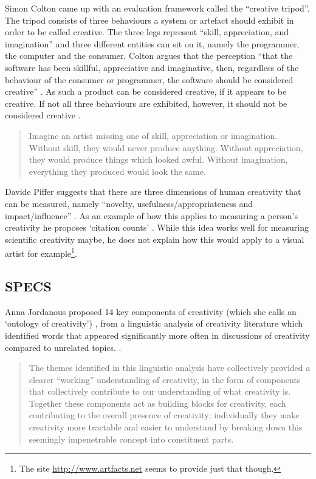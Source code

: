 Simon Colton came up with an evaluation framework called the ``creative tripod''. The tripod consists of three behaviours a system or artefact should exhibit in order to be called creative. The three legs represent ``skill, appreciation, and imagination'' and three different entities can sit on it, namely the programmer, the computer and the consumer. Colton argues that the perception ``that the software has been skillful, appreciative and imaginative, then, regardless of the behaviour of the consumer or programmer, the software should be considered creative'' \citeyear{Colton2008a, Colton2008}. As such a product can be considered creative, if it appears to be creative. If not all three behaviours are exhibited, however, it should not be considered creative \autocite{Colton2008a, Colton2008}.

\begin{quotation}
  Imagine an artist missing one of skill, appreciation or imagination. Without skill, they would never produce anything. Without appreciation, they would produce things which looked awful. Without imagination, everything they produced would look the same. 
\end{quotation}

\spirals

Davide Piffer suggests that there are three dimensions of human creativity that can be measured, namely ``novelty, usefulness/appropriateness and impact/influence'' \citeyear[p.258-259]{Piffer2012}. As an example of how this applies to measuring a person's creativity he proposes `citation counts' \autocite[p.261]{Piffer2012}. While this idea works well for measuring scientific creativity maybe, he does not explain how this would apply to a visual artist for example\footnote{The site \url{http://www.artfacts.net} seems to provide just that though.}.


\subsection{SPECS}
\label{s:specs}

Anna Jordanous proposed \num{14} key components of creativity (which she calls an  `ontology of creativity') \citeyear[p.104-120]{Jordanous2012}, from a linguistic analysis of creativity literature which identified words that appeared significantly more often in discussions of creativity compared to unrelated topics. \citeyear[p.120]{Jordanous2012}.

\begin{quotation}
  The themes identified in this linguistic analysis have collectively provided a clearer ``working'' understanding of creativity, in the form of components that collectively contribute to our understanding of what creativity is. Together these components act as building blocks for creativity, each contributing to the overall presence of creativity; individually they make creativity more tractable and easier to understand by breaking down this seemingly impenetrable concept into constituent parts. 
\end{quotation}

